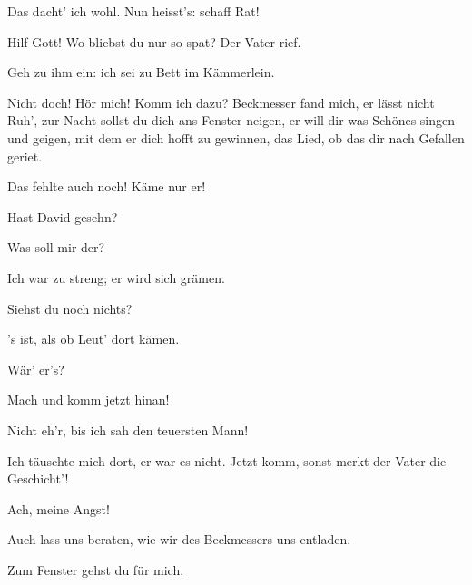 \begin{drama}

\Sachsspeaks


Das dacht' ich wohl. Nun heisst's:
schaff Rat!


\Magdalenespeaks
Hilf Gott! Wo bliebst du nur so spat? Der Vater rief.

\Evaspeaks
Geh zu ihm ein:
ich sei zu Bett im Kämmerlein.

\Magdalenespeaks
Nicht doch! Hör mich! Komm ich dazu?
Beckmesser fand mich, er lässt nicht Ruh',
zur Nacht sollst du dich ans Fenster neigen,
er will dir was Schönes singen und geigen,
mit dem er dich hofft zu gewinnen, das Lied,
ob das dir nach Gefallen geriet.

\Evaspeaks
Das fehlte auch noch! Käme nur er!

\Magdalenespeaks
Hast David gesehn?

\Evaspeaks
Was soll mir der?



\Magdalenespeaks


Ich war zu streng; er wird sich grämen.

\Evaspeaks
Siehst du noch nichts?

\Magdalenespeaks


's ist, als ob Leut' dort kämen.

\Evaspeaks
Wär' er's?

\Magdalenespeaks
Mach und komm jetzt hinan!

\Evaspeaks
Nicht eh'r, bis ich sah den teuersten Mann!

\Magdalenespeaks
Ich täuschte mich dort, er war es nicht.
Jetzt komm, sonst merkt der Vater die Geschicht'!

\Evaspeaks
Ach, meine Angst!

\Magdalenespeaks
Auch lass uns beraten, wie wir des Beckmessers uns entladen.

\Evaspeaks
Zum Fenster gehst du für mich.




\end{drama}
